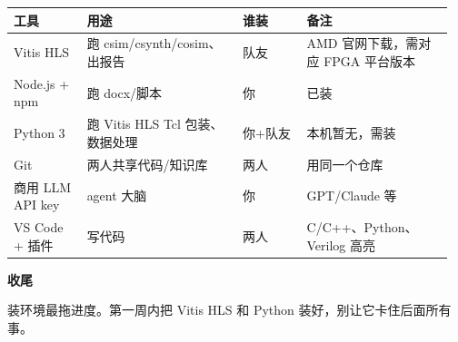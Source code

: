 \documentclass[12pt,a4paper]{ctexbook}
\begin{document}
\begin{longtable}{@{}p{0.16\linewidth}p{0.34\linewidth}p{0.14\linewidth}p{0.32\linewidth}@{}}
\toprule
\textbf{工具} & \textbf{用途} & \textbf{谁装} & \textbf{备注} \\
\midrule
\endhead
Vitis HLS & 跑 csim/csynth/cosim、出报告 & 队友 & AMD 官网下载，需对应 FPGA 平台版本 \\
Node.js + npm & 跑 docx/脚本 & 你 & 已装 \\
Python 3 & 跑 Vitis HLS Tcl 包装、数据处理 & 你+队友 & 本机暂无，需装 \\
Git & 两人共享代码/知识库 & 两人 & 用同一个仓库 \\
商用 LLM API key & agent 大脑 & 你 & GPT/Claude 等 \\
VS Code + 插件 & 写代码 & 两人 & C/C++、Python、Verilog 高亮 \\
\bottomrule
\end{longtable}

\begin{warnbox}
\textbf{收尾}\par
装环境最拖进度。第一周内把 Vitis HLS 和 Python 装好，别让它卡住后面所有事。
\end{warnbox}
\end{document}
